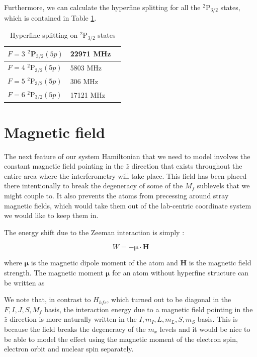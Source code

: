Furthermore, we can calculate the hyperfine splitting for all the $^2$P$_{3/2}$ states, which is contained in Table \ref{tableOfHyperfine deetuings}.

\begin{table}[h]
\centering
\begin{tabular}{|l|l|||r|}
\hline
$F=3$ $^2$P$_{3/2} (5p)$ & 22971  MHz\\ \hline
$F=4$ $^2$P$_{3/2} (5p)$ &  5803 MHz\\ \hline
$F=5$ $^2$P$_{3/2} (5p)$ &  306 MHz\\ \hline
$F=6$ $^2$P$_{3/2} (5p)$ &   17121 MHz\\ \hline
\end{tabular}
\caption{Hyperfine splitting on $^2$P$_{3/2}$ states}
\label{tableOfHyperfine deetuings}
\end{table}

\section{Magnetic field}\label{zeeman}

The next feature of our system Hamiltonian that we need to model involves the constant magnetic field pointing in the $\hat{z}$ direction that exists throughout the entire area where the interferometry will take place. This field has been placed there intentionally to break the degeneracy of some of the $M_f$ sublevels that we might couple to. It also prevents the atoms from precessing around stray magnetic fields, which would take them out of the lab-centric coordinate system we would like to keep them in.

The energy shift due to the Zeeman interaction is simply \cite{sobelman_spectra}: 

\begin{equation}
W=-\mathbf{\mu}\cdot\mathbf{H}
\end{equation}

where $\mathbf{\mu}$ is the magnetic dipole moment of the atom and $\mathbf{H}$ is the magnetic field strength. The magnetic moment $\mathbf{\mu}$ for an atom without hyperfine structure can be written as \cite{sobelman_spectra}

We note that, in contrast to $H_{hfs}$, which turned out to be diagonal in the $F,I,J,S,M_f$ basis, the interaction energy due to a magnetic field pointing in the $\hat{z}$ direction is more naturally written in the $I,m_I, L,m_L,S,m_S$ basis. This is because the field breaks the degeneracy of the $m_x$ levels and it would be nice to be able to model the effect using the magnetic moment of the electron spin, electron orbit and nuclear spin separately. 

